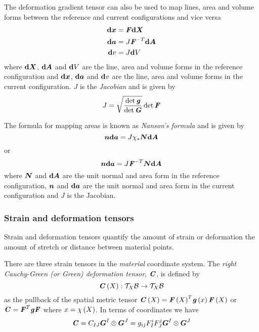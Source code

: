 The deformation gradient tensor can also be used to map lines, area and volume forms
between the reference and current configurations and vice versa \ie
\begin{align}
  \exteriorderiv{\covectr{x}} &= \tensor{F}\exteriorderiv{\covectr{X}} \\
  \exteriorderiv{\covectr{a}} &= J\invtranspose{\tensor{F}}\exteriorderiv{\covectr{A}} \\
  \exteriorderiv{v} &= J\exteriorderiv{V}
\end{align}
where $\exteriorderiv{\covectr{X}}$, $\exteriorderiv{\covectr{A}}$ and
$\exteriorderiv{V}$ are the line, area and volume forms in the reference
configuration and $\exteriorderiv{\covectr{x}}$, $\exteriorderiv{\covectr{a}}$ and
$\exteriorderiv{v}$ are the line, area and volume forms in the current
configuration. $J$ is the \emph{Jacobian} and is given by
\begin{equation}
  J=\sqrt{\dfrac{\det{\tensor{g}}}{\det{\tensor{G}}}}\det{\tensor{F}}
\end{equation}

The formula for mapping areas is known as \emph{Nanson's formula} and is
given by
\begin{equation}
  \covectr{n}\exteriorderiv{\covectr{a}}=J\pushforward{\chi}{\covectr{N}\exteriorderiv{\covectr{A}}}
\end{equation}
or
\begin{equation}
  \covectr{n}\exteriorderiv{\covectr{a}}=J\invtranspose{\tensor{F}}\covectr{N}\exteriorderiv{\covectr{A}}
\end{equation}
where $\covectr{N}$ and $\exteriorderiv{\covectr{A}}$ are the unit normal and
area form in the reference configuration,  $\covectr{n}$ and $\exteriorderiv{\covectr{a}}$ are the unit normal and
area form in the current configuration and $J$ is the Jacobian. 
  
\subsubsection{Strain and deformation tensors}

Strain and deformation tensors quantify the amount of strain or deformation
\ie the amount of stretch or distance between material points.  

There are three strain tensors in the \emph{material} coordinate system. The
\emph{right Cauchy-Green (or Green) deformation tensor}, $\tensor{C}$, is
defined by
\begin{equation}
  \mapping{\fnof{\tensor{C}}{X}}{\tangentspace{\embedmanifold{B}}{X}}{\tangentspace{\embedmanifold{B}}{X}}
\end{equation}
as the pullback of the spatial metric tensor \ie $\fnof{\tensor{C}}{X}=\transpose{\fnof{\tensor{F}}{X}}\fnof{\tensor{g}}{x}\fnof{\tensor{F}}{X}$
or $\tensor{C}=\transpose{\tensor{F}}\tensor{g}\tensor{F}$ where $x=\fnof{\chi}{X}$. In terms of coordinates we
have
\begin{equation}
  \tensor{C}=C_{IJ}\tensorprod{\vectr{G}^{I}}{\vectr{G}^{J}}=g_{ij}F^{i}_{I}F^{j}_{J}\tensorprod{\vectr{G}^{I}}{\vectr{G}^{J}}
\end{equation}

